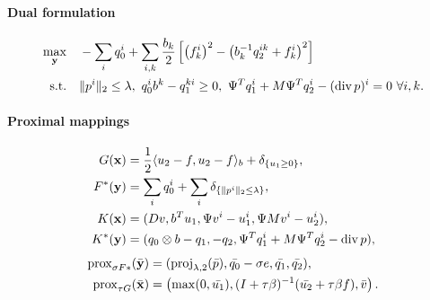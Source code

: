 \paragraph{Dual formulation}
\begin{align*}
    \max_{\mathbf{y}} \quad
        & -\sum_i q_0^i+ \sum_{i,k} \frac{b_k}{2} \left [
                \left(f_k^i\right)^2
                - \left(b_k^{-1} q_2^{ik} + f_k^i\right)^2
            \right ] \\
    \text{s.t.}\quad
        & \|p^{i}\|_{2} \leq \lambda,
          ~q_0^i b^k - q_1^{ki} \geq 0,
          ~\Psi^T q_1^i + M \Psi^T q_2^i - (\operatorname{div} p)^i = 0 ~\forall i,k.
\end{align*}

\paragraph{Proximal mappings}
\begin{align*}
    G(\mathbf{x}) &= \frac{1}{2} \langle u_2-f, u_2-f \rangle_b
        + \delta_{\{u_1 \geq 0\}}, \\
    F^*(\mathbf{y}) &= \sum_{i} q_0^i
        + \sum_{i} \delta_{\{\|p^{i}\|_{2} \leq \lambda\}}, \\
    K(\mathbf{x}) &= (
        Dv,
        b^T u_1,
        \Psi v^i - u_1^i,
        \Psi M v^i - u_2^i
    ), \\
    K^*(\mathbf{y}) &= (
        q_0 \otimes b - q_1,
        -q_2,
        \Psi^T q_1^i + M \Psi^T q_2^i - \operatorname{div}{p}
    ),
\end{align*}
\begin{align*}
    \operatorname{prox}_{\sigma F*}(\bar{\mathbf{y}})
    &= (
        \operatorname{proj}_{\lambda,2}(\bar{p}),
        \bar{q_0}-\sigma e,
        \bar{q_1},
        \bar{q_2}
    ), \\
    \operatorname{prox}_{\tau G}(\bar{\mathbf{x}})
    &= \left(
        \max(0,\bar{u_1}),
        (I+\tau \beta)^{-1}(\bar{u_2} + \tau \beta f),
        \bar{v}
    \right).
\end{align*}
